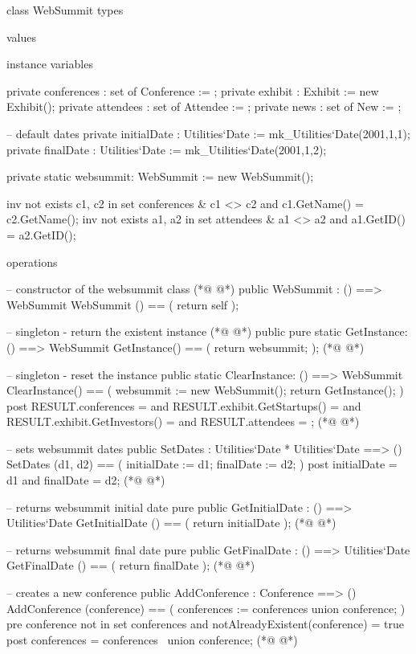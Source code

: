 \begin{vdmpp}[breaklines=true]
class WebSummit
types

values

instance variables

 private conferences : set of Conference := {};
 private exhibit : Exhibit := new Exhibit();
 private attendees : set of Attendee := {};
 private news : set of New := {};
 
 -- default dates
 private initialDate : Utilities`Date := mk_Utilities`Date(2001,1,1);
 private finalDate : Utilities`Date := mk_Utilities`Date(2001,1,2);
 
 private static websummit: WebSummit := new WebSummit();
 
 inv not exists c1, c2 in set conferences & c1 <> c2 and c1.GetName() = c2.GetName();
 inv not exists a1, a2 in set attendees & a1 <> a2 and a1.GetID() = a2.GetID();
 
operations

 -- constructor of the websummit class 
(*@
\label{WebSummit:25}
@*)
 public WebSummit :  () ==> WebSummit
    WebSummit () == (
     return self
    );
    
 -- singleton - return the existent instance
(*@
\label{GetInstance:31}
@*)
 public pure static GetInstance: () ==> WebSummit 
   GetInstance() == (
    return websummit;
   );
(*@
\label{ClearInstance:35}
@*)
    
 -- singleton - reset the instance
 public static ClearInstance: () ==> WebSummit
  ClearInstance() == (
   websummit := new WebSummit();
   return GetInstance();
  )
  post RESULT.conferences = {} and RESULT.exhibit.GetStartups() = {}
    and RESULT.exhibit.GetInvestors() = {} and RESULT.attendees = {};  
(*@
\label{SetDates:44}
@*)
    
  -- sets websummit dates
  public SetDates : Utilities`Date * Utilities`Date ==> ()
    SetDates (d1, d2) == (
     initialDate := d1;
     finalDate := d2;
    )
    post initialDate = d1 and finalDate = d2;
(*@
\label{GetInitialDate:52}
@*)
    
  --  returns websummit initial date
  pure public GetInitialDate : () ==> Utilities`Date
    GetInitialDate () == (
     return initialDate
    );
(*@
\label{GetFinalDate:58}
@*)
    
  -- returns websummit final date
  pure public GetFinalDate : () ==> Utilities`Date
    GetFinalDate () == (
     return finalDate
    ); 
(*@
\label{AddConference:64}
@*)
   
   -- creates a new conference
  public AddConference : Conference ==> ()
    AddConference (conference) == (
     conferences := conferences union {conference};
    )
    pre conference not in set conferences and notAlreadyExistent(conference) = true
   post conferences = conferences~ union {conference};
(*@
\label{AddTalk:72}
@*)
   

\end{vdmpp}
